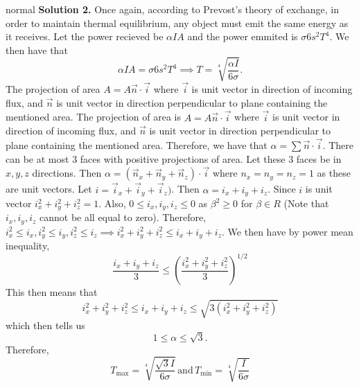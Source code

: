 \begin{solution}{normal}
\tcbline
\textbf{Solution 2.} 
Once again, according to Prevost’s theory of exchange, in order to maintain thermal equilibrium, any object must emit the same energy as it receives. Let the power recieved be $\alpha IA$ and the power emmited is $\sigma 6s^2 T^4$. We then have that 
\[\alpha IA = \sigma 6s^2 T^4\implies T = \sqrt[4]{\frac{\alpha I}{6\sigma}}.\]
The projection of area $A = A \vec n \cdot \vec i $ where $\vec i$ is unit vector in direction of incoming flux, and $\vec n$ is unit vector in direction perpendicular to plane containing the mentioned area. The projection of area is $A = A \vec n \cdot \vec i $ where $\vec i$ is unit vector in direction of incoming flux, and $\vec n$ is unit vector in direction perpendicular to plane containing the mentioned area. Therefore, we have that $\alpha = \sum \vec n \cdot \vec i$. There can be at most $3$ faces with positive projections of area. Let these $3$ faces be in $x,y,z$ directions. Then $\alpha = (\vec n_x + \vec n_y + \vec n_z)\cdot \vec i$ where $n_x = n_y = n_z = 1$ as these are unit vectors. Let $i= \vec i_x + \vec i_y + \vec i_z)$. Then $\alpha = i_x + i_y + i_z$. Since $i$ is unit vector $i_x^2 +i_y^2 +i_z^2 =1$. Also, $0\leq i_x,i_y,i_z \leq 0$ as $\beta^2\geq 0$ for $\beta \in R$ (Note that $i_x,i_y,i_z$ cannot be all equal to zero). Therefore, $i_x^2 \leq i_x,i_y^2\leq i_y,i_z^2\leq i_z \implies i_x^2 +i_y^2 +i_z^2 \leq i_x + i_y + i_z$. We then have by power mean inequality,
$$\frac {i_x + i_y + i_z}{3} \leq \left(\frac {i_x^2 +i_y^2 +i_z^2}{3}\right)^{1/2}$$
This then means that 
$$i_x^2 +i_y^2 +i_z^2 \leq i_x + i_y + i_z \leq \sqrt{3(i_x^2+i_y^2+i_z^2)} $$
which then tells us 
$$1\leq \alpha \leq \sqrt 3.$$
Therefore,
$$T_{\text{max}} = \sqrt[4] {\frac{\sqrt 3 I}{6\sigma}}\, \text{and}\,T_{\text{min}} = \sqrt[4]{\frac{I}{6\sigma}}$$
\end{solution}